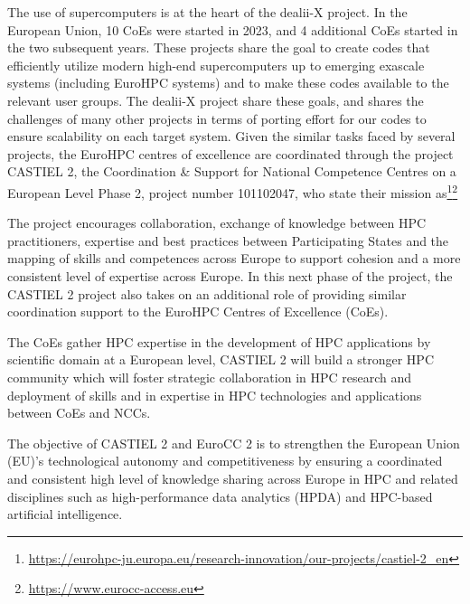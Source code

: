 \documentclass[a4paper,12pt]{article}
\begin{document}
The use of supercomputers is at the heart of the dealii-X project. In the
European Union, 10 CoEs were started in 2023, and 4 additional CoEs started in
the two subsequent years. These projects share the goal to create codes that
efficiently utilize modern high-end supercomputers up to emerging exascale
systems (including EuroHPC systems) and to make these codes available to the
relevant user groups. The dealii-X project share these goals, and shares the
challenges of many other projects in terms of porting effort for our codes to
ensure scalability on each target system. Given the similar tasks faced by
several projects, the EuroHPC centres of excellence are coordinated through
the project CASTIEL 2, the Coordination \& Support for National Competence
Centres on a European Level Phase 2, project number 101102047, who state
their mission
as\footnote{\url{https://eurohpc-ju.europa.eu/research-innovation/our-projects/castiel-2_en}}\footnote{\url{https://www.eurocc-access.eu}}
\begin{center}
  \begin{minipage}{0.8\textwidth}
    The project encourages collaboration, exchange of knowledge between HPC
    practitioners, expertise and best practices between Participating States
    and the mapping of skills and competences across Europe to support
    cohesion and a more consistent level of expertise across Europe. In this
    next phase of the project, the CASTIEL 2 project also takes on an
    additional role of providing similar coordination support to the EuroHPC
    Centres of Excellence (CoEs).

    The CoEs gather HPC expertise in the development of HPC applications by
    scientific domain at a European level, CASTIEL 2 will build a stronger HPC
    community which will foster strategic collaboration in HPC research and
    deployment of skills and in expertise in HPC technologies and applications
    between CoEs and NCCs.
  \end{minipage}

  \begin{minipage}{0.8\textwidth}
    The objective of CASTIEL 2 and EuroCC 2 is to strengthen the European
    Union (EU)’s technological autonomy and competitiveness by ensuring a
    coordinated and consistent high level of knowledge sharing across Europe
    in HPC and related disciplines such as high-performance data analytics
    (HPDA) and HPC-based artificial intelligence.
  \end{minipage}
\end{center}
\end{document}
